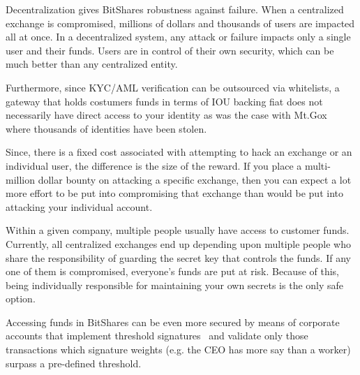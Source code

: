 Decentralization gives BitShares robustness against failure. When a
centralized exchange is compromised, millions of dollars and thousands of users
are impacted all at once. In a decentralized system, any attack or failure
impacts only a single user and their funds. Users are in control of their own
security, which can be much better than any centralized entity.

Furthermore, since KYC/AML verification can be outsourced via whitelists, a
gateway that holds costumers funds in terms of IOU backing fiat does not
necessarily have direct access to your identity as was the case with
Mt.Gox~\cite{mtgox} where thousands of identities have been stolen.

Since, there is a fixed cost associated with attempting to hack an exchange or
an individual user, the difference is the size of the reward. If you place a
multi-million dollar bounty on attacking a specific exchange, then you can
expect a lot more effort to be put into compromising that exchange than would
be put into attacking your individual account.

Within a given company, multiple people usually have access to customer funds.
%
%
Currently, all centralized exchanges end up depending upon multiple people who
share the responsibility of guarding the secret key that controls the funds.
If any one of them is compromised, everyone's funds are put at risk. Because of
this, being individually responsible for maintaining your own secrets is the
only safe option.

Accessing funds in BitShares can be even more secured by means of corporate
accounts that implement threshold signatures~\cite{bts:general,ripple:multisig}
and validate only those transactions which signature weights (e.g. the CEO has
more say than a worker) surpass a pre-defined threshold.

